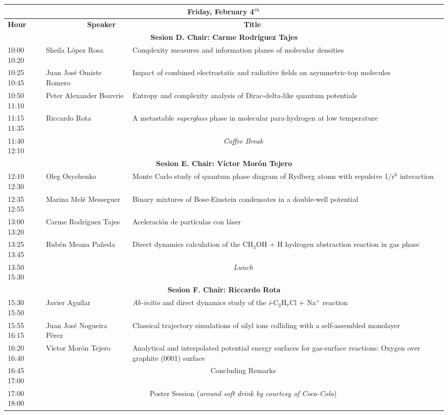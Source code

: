 \begin{flushleft}
\begin{tabular}{|m{1.0cm}|m{4.8cm}|m{10.2cm}|}
\multicolumn{3}{c}{\textbf{Friday, February 4$^{\rm th}$}}\\ 
\hline
\cellcolor[gray]{0.7} {\bf Hour} & \cellcolor[gray]{0.7} {\bf ~~~~~~~~~~Speaker} &\cellcolor[gray]{0.7} {\bf ~~~~~~~~~~~~~~~~~~~~~~~~~~~Title}\\
\hline
\multicolumn{3}{c}{ \cellcolor[gray]{0.7} \bf  Sesion D. Chair: Carme Rodr\'iguez Tajes} \\
\hline
10:00 10:20 & Sheila L\'opez Rosa & Complexity measures and information planes of molecular densities \\ 
\hline
10:25 10:45 & Juan Jos\'e Omiste Romero & Impact of combined electrostatic and radiative fields on asymmetric-top molecules \\ 
\hline
10:50 11:10 & Peter Alexander Bouvrie & Entropy and complexity analysis of Dirac-delta-like quantum potentials \\ 
\hline
11:15 11:35 & Riccardo Rota & A metastable {\it superglass} phase in molecular para-hydrogen at low temperature \\ 
\hline
11:40 12:10 & \multicolumn{2}{c|}{\it Coffee Break} \\ 
\hline
\multicolumn{3}{c}{ \cellcolor[gray]{0.7} \bf  Sesion E. Chair: Víctor Mor\'on Tejero } \\ 
\hline
12:10 12:30 & Oleg Osychenko & Monte Carlo study of quantum phase diagram of Rydberg atoms with repulsive 1/r$^6$ interaction \\ 
\hline
12:35 12:55 & Marina Mel\'e Messeguer & Binary mixtures of Bose-Einstein condensates in a double-well potential \\ 
\hline
13:00 13:20 & Carme Rodr\'iguez Tajes & Aceleraci\'on de part\'iculas con l\'aser \\ 
\hline
13:25 13:45 & Rub\'en Meana Pa\~neda & Direct dynamics calculation of the CH$_3$OH + H hydrogen abstraction reaction in gas phase \\ 
\hline
13:50 15:30 & \multicolumn{2}{c|}{\it Lunch} \\ 
\hline
\multicolumn{3}{c}{ \cellcolor[gray]{0.7}  \bf Sesion F. Chair: Riccardo Rota } \\
\hline
15:30 15:50 & Javier Aguilar & {\it Ab-initio} and direct dynamics study of the {\it i}-C$_3$H$_7$Cl + Na$^+$  reaction \\ 
\hline
15:55 16:15 & Juan Jos\'e Nogueira Pérez & Classical trajectory simulations of silyl ions colliding with a self-assembled monolayer \\ 
\hline
16:20 16:40 & Víctor Mor\'on Tejero & Analytical and interpolated potential energy surfaces for gas-surface reactions: Oxygen over graphite (0001) surface \\ 
\hline
16:45 17:00 & \multicolumn{2}{c|}{Concluding Remarks} \\ 
\hline
17:00 18:00 & \multicolumn{2}{c|}{Poster Session ({\it around soft drink by courtesy of Coca-Cola})} \\ 
\hline
\end{tabular}
\end{flushleft}
%
\newpage

